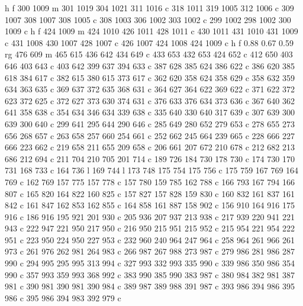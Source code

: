 {{        h f
        300 1009 m
        301 1019 304 1021 311 1016 c
        318 1011 319 1005 312 1006 c
        309 1007 308 1007 308 1005 c
        308 1003 306 1002 303 1002 c
        299 1002 298 1002 300 1009 c
        h f
        424 1009 m
        424 1010 426 1011 428 1011 c
        430 1011 431 1010 431 1009 c
        431 1008 430 1007 428 1007 c
        426 1007 424 1008 424 1009 c
        h f
        0.88 0.67 0.59 rg
        476 609 m
        465 615 436 642 434 649 c
        433 653 432 653 424 652 c
        412 650 403 646 403 643 c
        403 642 399 637 394 633 c
        387 628 385 624 386 622 c
        386 620 385 618 384 617 c
        382 615 380 615 373 617 c
        362 620 358 624 358 629 c
        358 632 359 634 363 635 c
        369 637 372 635 368 631 c
        364 627 364 622 369 622 c
        371 622 372 623 372 625 c
        372 627 373 630 374 631 c
        376 633 376 634 373 636 c
        367 640 362 641 358 638 c
        354 634 346 634 339 638 c
        335 640 330 640 317 639 c
        307 639 300 639 300 640 c
        299 641 295 644 290 646 c
        285 649 280 652 279 653 c
        278 655 273 656 268 657 c
        263 658 257 660 254 661 c
        252 662 245 664 239 665 c
        228 666 227 666 223 662 c
        219 658 211 655 209 658 c
        206 661 207 672 210 678 c
        212 682 213 686 212 694 c
        211 704 210 705 201 714 c
        189 726 184 730 178 730 c
        174 730 170 731 168 733 c
        164 736 l
        169 744 l
        173 748 175 754 175 756 c
        175 759 167 769 164 769 c
        162 769 157 775 157 778 c
        157 780 159 785 162 788 c
        166 793 167 794 166 807 c
        165 820 164 822 160 825 c
        157 827 157 828 159 830 c
        160 832 161 837 161 842 c
        161 847 162 853 162 855 c
        164 858 161 887 158 902 c
        156 910 164 916 175 916 c
        186 916 195 921 201 930 c
        205 936 207 937 213 938 c
        217 939 220 941 221 943 c
        222 947 221 950 217 950 c
        216 950 215 951 215 952 c
        215 954 221 954 222 951 c
        223 950 224 950 227 953 c
        232 960 240 964 247 964 c
        258 964 261 966 261 973 c
        261 976 262 981 264 983 c
        266 987 267 988 273 987 c
        279 986 281 986 287 990 c
        294 995 295 995 313 994 c
        327 993 332 993 335 990 c
        339 986 350 986 354 990 c
        357 993 359 993 368 992 c
        383 990 385 990 383 987 c
        380 984 382 981 387 981 c
        390 981 390 981 390 984 c
        389 987 389 988 391 987 c
        393 986 394 986 395 986 c
        395 986 394 983 392 979 c
}}
